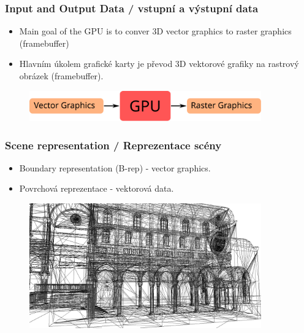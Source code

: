 
\begin{frame}
\frametitle{Input and Output Data / vstupní a výstupní data}
	\begin{itemize}
    \item{Main goal of the GPU is to conver 3D vector graphics to raster graphics (framebuffer)}
	\end{itemize}
	\begin{itemize}
    \item{Hlavním úkolem grafické karty je převod 3D vektorové grafiky na rastrový obrázek (framebuffer).}
	\end{itemize}
	\begin{figure}[h]
		\includegraphics[width=10cm,keepaspectratio]{pics/model/vector2raster}
	\end{figure}
\end{frame}

\begin{frame}
\frametitle{Scene representation / Reprezentace scény}
	\begin{itemize}
    \item{Boundary representation (B-rep) - vector graphics.}
	\end{itemize}
	\begin{itemize}
		\item{Povrchová reprezentace - vektorová data.}
	\end{itemize}
	\begin{figure}[h]
		\includegraphics[width=10cm,keepaspectratio]{pics/model/wireframe.jpg}
	\end{figure}
\end{frame}

